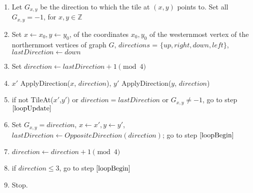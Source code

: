 \begin{enumerate}[1.]
\item Let $G_{x,y}$ be the direction to which the tile at $(x,y)$ points to. Set all $G_{x,y}=-1$, for $x,y \in \mathbb{Z}$
\item Set $x\gets x_0, y\gets y_0$, of the coordinates $x_0,y_0$ of the westernmost vertex of the northernmost vertices of graph $G$, $directions$ = $\{up,right,down,left\}$, $lastDirection\gets down$
\item \label{loopBegin} Set $direction \gets lastDirection+1 \pmod{4}$
\item $x'$ \gets ApplyDirection($x$, $direction$), $y'$ \gets ApplyDirection($y$, $direction$)
\item if not TileAt($x'$,$y'$) or $direction = lastDirection$ or $G_{x,y}\ne -1$, go to step $\ref{loopUpdate}$
\item Set $G_{x,y} = direction$, $x \gets x', y \gets y'$, $lastDirection \gets OppositeDirection(direction)$; go to step $\ref{loopBegin}$
\item \label{loopUpdate} $direction \gets direction+1 \pmod{4}$
\item if $direction\leq 3$, go to step $\ref{loopBegin}$
\item Stop.
\end{enumerate}